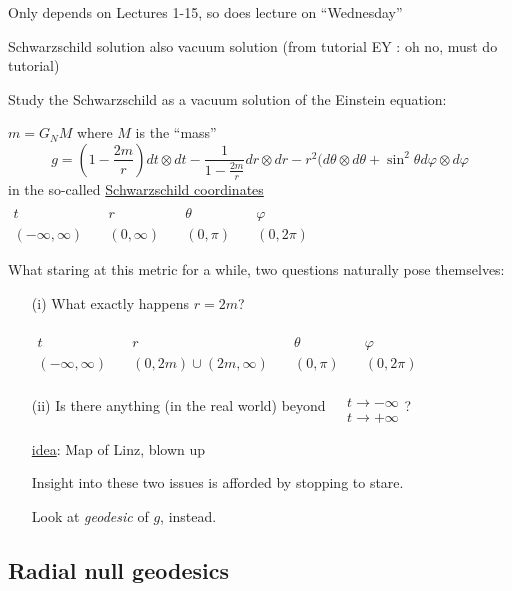 \documentclass[10pt, twoside]{amsart}
\begin{document}
\begin{multicols*}{2}
Only depends on Lectures 1-15, so does lecture on ``Wednesday''

Schwarzschild solution also vacuum solution (from tutorial EY : oh no, must do tutorial)

Study the Schwarzschild as a vacuum solution of the Einstein equation:

$m = G_N M$ where $M$ is the ``mass''
\[
g = \left( 1 - \frac{2m}{r} \right) dt \otimes dt - \frac{1}{ 1 - \frac{2m}{r} } dr \otimes dr - r^2 ( d\theta \otimes d\theta + \sin^2{\theta} d\varphi \otimes d\varphi
\]
in the so-called \underline{Schwarzschild coordinates}  $\begin{aligned} & & & & \quad \\
 t \quad & r \quad & \theta \quad & \varphi \\ 
 (-\infty,\infty) \quad & (0,\infty) \quad & (0,\pi) \quad & (0,2\pi) \end{aligned}$

What staring at this metric for a while, two questions naturally pose themselves:

\begin{enumerate}
\item[(i)] What exactly happens \@ $r= 2m$?

$\begin{aligned} & & & & \quad \\
 t \quad & r \quad & \theta \quad & \varphi \\ 
 (-\infty,\infty) \quad & (0,2m) \cup ( 2m, \infty) \quad & (0,\pi) \quad & (0,2\pi) \end{aligned}$


\item[(ii)] Is there anything (in the real world) beyond $\begin{aligned} & \quad \\
  & t \to -\infty \\
  & t\to +\infty \end{aligned}$?

\underline{idea}: Map of Linz, blown up

Insight into these two issues is afforded by stopping to stare.  

Look at \emph{geodesic} of $g$, instead.

\end{enumerate}

\subsection{Radial null geodesics}


\end{multicols*}
\end{document}

